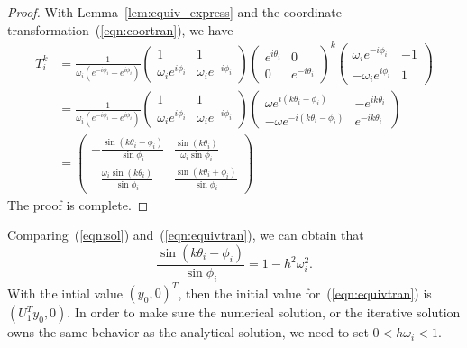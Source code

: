 \documentclass[11pt,fceqn]{article}
\numberwithin{equation}{section}
\theoremstyle{definition}
\begin{document}
\begin{proof}
With Lemma~\ref{lem:equiv_express} and the coordinate transformation~(\ref{eqn:coortran}), we have
$$
\begin{aligned}
T_{i}^{k} & =\frac{1}{\omega_{i} \left(e^{-i\phi_{i}} - e^{i\phi_{i}}\right)}
           \begin{pmatrix}
           1 & 1 \\
           \omega_{i} e^{i\phi_{i}} & \omega_{i} e^{-i\phi_{i}}
           \end{pmatrix}
           \begin{pmatrix}
           e^{i\theta_{i}} & 0 \\
           0 & e^{-i\theta_{i}}
           \end{pmatrix}^{k} \begin{pmatrix}
           \omega_{i} e^{-i\phi_{i}} & -1 \\
           -\omega_{i} e^{i\phi_{i}} & 1
           \end{pmatrix}\\
                & =\frac{1}{\omega_{i} \left(e^{-i\phi_{i}} - e^{i\phi_{i}}\right)}
           \begin{pmatrix}
           1 & 1 \\
           \omega_{i} e^{i\phi_{i}} & \omega_{i} e^{-i\phi_{i}}
           \end{pmatrix} \begin{pmatrix}
           \omega e^{i(k\theta_{i} -\phi_{i})} & -e^{ik\theta_{i}} \\
           -\omega e^{-i(k\theta_{i} -\phi_{i})} & e^{-ik\theta_{i}}
           \end{pmatrix} \\
             & = \begin{pmatrix}
                    -\frac{\sin(k\theta_{i} - \phi_{i})}{\sin\phi_{i}} & \frac{\sin (k\theta_{i})}{\omega_{i}\sin\phi_{i}} \\
                    -\frac{\omega_{i} \sin (k\theta_{i})}{\sin\phi_{i}} & \frac{\sin(k\theta_{i} + \phi_{i})}{\sin\phi_{i}}
                    \end{pmatrix}  
\end{aligned}
$$
The proof is complete.
\end{proof}
Comparing~(\ref{eqn:sol}) and~(\ref{eqn:equivtran}), we can obtain that 
$$
\frac{\sin(k\theta_{i} - \phi_{i})}{\sin\phi_{i}} = 1 - h^{2}\omega_{i}^{2}.
$$
With the intial value $(y_{0},0)^{T}$, then the initial value for~(\ref{eqn:equivtran}) is $(U_{1}^{T}y_{0}, 0)$. In order to make sure the numerical solution, or the iterative solution owns the same behavior as the analytical solution, we need to set $0< h\omega_{i} < 1$. 
\end{document}
